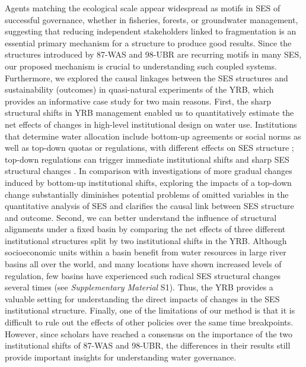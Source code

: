 Agents matching the ecological scale appear widespread as motifs in SES of successful governance, whether in fisheries, forests, or groundwater management, suggesting that reducing independent stakeholders linked to fragmentation is an essential primary mechanism for a structure to produce good results.
Since the structures introduced by 87-WAS and 98-UBR are recurring motifs in many SES, our proposed mechanism is crucial to understanding such coupled systems.
Furthermore, we explored the causal linkages between the SES structures and sustainability (outcomes) in quasi-natural experiments of the YRB, which provides an informative case study for two main reasons.
First, the sharp structural shifts in YRB management enabled us to quantitatively estimate the net effects of changes in high-level institutional design on water use. Institutions that determine water allocation include bottom-up agreements or social norms as well as top-down quotas or regulations, with different effects on SES structure \cite{wang2019d,speed2013}; top-down regulations can trigger immediate institutional shifts and sharp SES structural changes \cite{speed2013,roland2004}.
In comparison with investigations of more gradual changes induced by bottom-up institutional shifts, exploring the impacts of a top-down change substantially diminishes potential problems of omitted variables in the quantitative analysis of SES and clarifies the causal link between SES structure and outcome.
Second, we can better understand the influence of structural alignments under a fixed basin by comparing the net effects of three different institutional structures split by two institutional shifts in the YRB. Although socioeconomic units within a basin benefit from water resources in large river basins all over the world, and many locations have shown increased levels of regulation, few basins have experienced such radical SES structural changes several times (see \textit{Supplementary Material} S1). Thus, the YRB provides a valuable setting for understanding the direct impacts of changes in the SES institutional structure.
Finally, one of the limitations of our method is that it is difficult to rule out the effects of other policies over the same time breakpoints.
However, since scholars have reached a consensus on the importance of the two institutional shifts of 87-WAS and 98-UBR, the differences in their results still provide important insights for understanding water governance.

